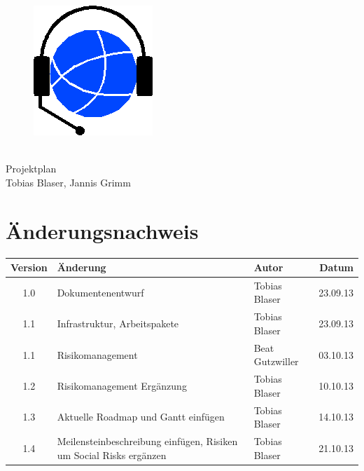 

\providecommand{\documentType}{Projektplan}
\providecommand{\versionnumber}{1.0}



\thispagestyle{empty}
\begin{titlepage}
	\begin{center}

	\vspace*{40mm}
	
	\begin{figure}[htp]
		\centering
		\includegraphics[scale=0.60]{../img/icon-js-voip.png}
	\end{figure}		
	\vspace*{20mm}
	
	{\fontsize{40}{48} \selectfont \project \\[10mm]}
	{\fontsize{40}{48} \selectfont \documentType \\[5mm]}	
	\vspace*{20mm}
	Tobias Blaser, Jannis Grimm

\end{center}
\end{titlepage}
\clearpage

\chapter*{Änderungsnachweis}
\begin{tabularx}{\textwidth}{|cXlr|} %
		\hline
		\textbf{Version} & \textbf{Änderung} & \textbf{Autor} & \textbf{Datum}\\
		\hline
		1.0 & Dokumentenentwurf & Tobias Blaser & 23.09.13\\
		1.1 & Infrastruktur, Arbeitspakete & Tobias Blaser & 23.09.13\\
		1.1 & Risikomanagement & Beat Gutzwiller & 03.10.13\\
		1.2 & Risikomanagement Ergänzung & Tobias Blaser & 10.10.13\\
		1.3 & Aktuelle Roadmap und Gantt einfügen & Tobias Blaser & 14.10.13\\
		1.4 & Meilensteinbeschreibung einfügen, Risiken um Social Risks ergänzen & Tobias Blaser & 21.10.13\\
		\hline
\end{tabularx}

\tableofcontents








